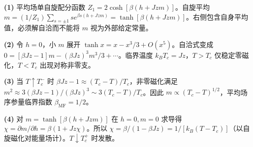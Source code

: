 \par\noindent\textbf{(1)} 平均场单自旋配分函数 \(Z_1=2\cosh[\beta(h+Jzm)]\)。自旋平均 \(m=(1/Z_1)\sum_{s=\pm1}s e^{\beta s(h+Jzm)}=\tanh[\beta(h+Jzm)]\)。右侧包含自身平均值，必须解自洽而不能将 \(m\) 视为外部给定常量。
\par\noindent\textbf{(2)} 令 \(h=0\)，小 \(m\) 展开 \(\tanh x=x-x^3/3+O(x^5)\)。自洽式变成 \(0=[\beta Jz-1]m-(\beta Jz)^3m^3/3+\cdots\)。临界温度 \(k_BT_c=Jz\)，\(T>T_c\) 仅稳定零磁化，\(T<T_c\) 出现对称非零支。
\par\noindent\textbf{(3)} 当 \(T\uparrow T_c^-\) 时 \(\beta Jz-1\approx(T_c-T)/T_c\)，非零磁化满足 \(m^2\approx3(\beta Jz-1)/(\beta Jz)^3\sim3(T_c-T)/T_c\)。因此 \(m\propto(T_c-T)^{1/2}\)，平均场序参量临界指数 \(\beta_{\mathrm{MF}}=1/2\)。
\par\noindent\textbf{(4)} 对 \(m=\tanh[\beta(h+Jzm)]\) 在 \(h=0,m=0\) 求导得 \(\chi=\partial m/\partial h=\beta(1+Jz\chi)\)。所以 \(\chi=\beta/(1-\beta Jz)=1/[k_B(T-T_c)]\)（以自旋磁化对能量场计）。\(T\downarrow T_c^+\) 时发散。
